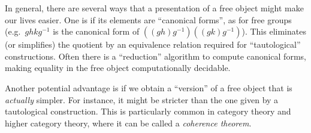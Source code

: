 \documentclass[10pt]{article}
\numberwithin{equation}{section}
\begin{document}
In general, there are several ways that a presentation of a free object might make our lives easier.
One is if its elements are ``canonical forms'', as for free groups (e.g.\ $g h k g^{-1}$ is the canonical form of $((g h) g^{-1})((g k) g^{-1})$).
This eliminates (or simplifies) the quotient by an equivalence relation required for ``tautological'' constructions.
Often there is a ``reduction'' algorithm to compute canonical forms, making equality in the free object computationally decidable.

Another potential advantage is if we obtain a ``version'' of a free object that is \emph{actually} simpler.
For instance, it might be stricter than the one given by a tautological construction.
This is particularly common in category theory and higher category theory, where it can be called a \emph{coherence theorem}.


\end{document}
